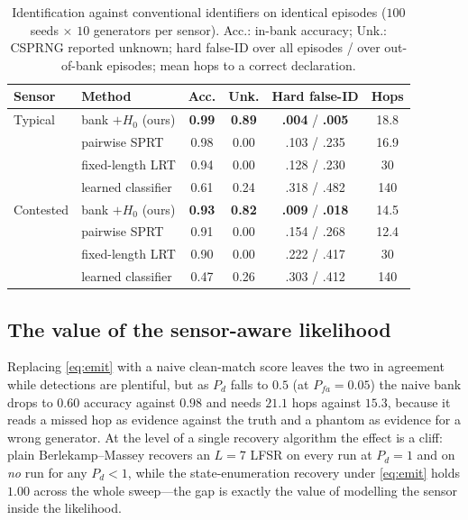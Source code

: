 \documentclass[conference]{IEEEtran}
\begin{document}
\begin{table}[t]
\centering
\caption{Identification against conventional identifiers on identical episodes
($100$ seeds $\times$ $10$ generators per sensor). Acc.: in-bank accuracy;
Unk.: CSPRNG reported unknown; hard false-ID over all episodes / over
out-of-bank episodes; mean hops to a correct declaration.}
\label{tab:idbase}
\setlength{\tabcolsep}{3.2pt}
\footnotesize
\begin{tabular}{@{}llcccc@{}}
\toprule
Sensor & Method & Acc. & Unk. & Hard false-ID & Hops \\
\midrule
Typical   & bank $+H_0$ (ours) & \textbf{0.99} & \textbf{0.89} & \textbf{.004} / \textbf{.005} & 18.8 \\
          & pairwise SPRT      & 0.98 & 0.00 & .103 / .235 & 16.9 \\
          & fixed-length LRT   & 0.94 & 0.00 & .128 / .230 & 30 \\
          & learned classifier & 0.61 & 0.24 & .318 / .482 & 140 \\
\midrule
Contested & bank $+H_0$ (ours) & \textbf{0.93} & \textbf{0.82} & \textbf{.009} / \textbf{.018} & 14.5 \\
          & pairwise SPRT      & 0.91 & 0.00 & .154 / .268 & 12.4 \\
          & fixed-length LRT   & 0.90 & 0.00 & .222 / .417 & 30 \\
          & learned classifier & 0.47 & 0.26 & .303 / .412 & 140 \\
\bottomrule
\end{tabular}
\end{table}

\subsection{The value of the sensor-aware likelihood}
Replacing \eqref{eq:emit} with a naive clean-match score leaves the two in
agreement while detections are plentiful, but as $P_d$ falls to $0.5$
(at $P_{fa}=0.05$) the naive bank drops to $0.60$ accuracy against $0.98$ and
needs $21.1$ hops against $15.3$, because it reads a missed hop as evidence
against the truth and a phantom as evidence for a wrong generator. At the level
of a single recovery algorithm the effect is a cliff: plain Berlekamp--Massey
recovers an $L{=}7$ LFSR on every run at $P_d{=}1$ and on \emph{no} run for any
$P_d<1$, while the state-enumeration recovery under \eqref{eq:emit} holds $1.00$
across the whole sweep---the gap is exactly the value of modelling the sensor
inside the likelihood.
\end{document}
